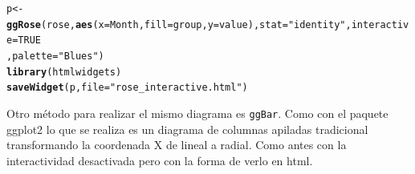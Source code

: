 \documentclass{article}\usepackage[]{graphicx}\usepackage[]{color}
\makeatletter
\newcommand{\hlnum}[1]{\textcolor[rgb]{0.686,0.059,0.569}{#1}}%
\newcommand{\hlstr}[1]{\textcolor[rgb]{0.192,0.494,0.8}{#1}}%
\newcommand{\hlstd}[1]{\textcolor[rgb]{0.345,0.345,0.345}{#1}}%
\newcommand{\hlkwb}[1]{\textcolor[rgb]{0.69,0.353,0.396}{#1}}%
\newcommand{\hlkwc}[1]{\textcolor[rgb]{0.333,0.667,0.333}{#1}}%
\newcommand{\hlkwd}[1]{\textcolor[rgb]{0.737,0.353,0.396}{\textbf{#1}}}%
\newenvironment{kframe}{%
 \def\at@end@of@kframe{}%
 \ifinner\ifhmode%
  \def\at@end@of@kframe{\end{minipage}}%
  \begin{minipage}{\columnwidth}%
 \fi\fi%
 \def\FrameCommand##1{\hskip\@totalleftmargin \hskip-\fboxsep
 \colorbox{shadecolor}{##1}\hskip-\fboxsep
     \hskip-\linewidth \hskip-\@totalleftmargin \hskip\columnwidth}%
 \MakeFramed {\advance\hsize-\width
   \@totalleftmargin\z@ \linewidth\hsize
   \@setminipage}}%
 {\par\unskip\endMakeFramed%
 \at@end@of@kframe}
\newenvironment{knitrout}{}{} %
\makeatother
\begin{document}
\begin{knitrout}
\color{fgcolor}\begin{kframe}
\begin{alltt}
\hlstd{p} \hlkwb{<-} \hlkwd{ggRose}\hlstd{(rose,}\hlkwd{aes}\hlstd{(}\hlkwc{x}\hlstd{=Month,}\hlkwc{fill}\hlstd{=group,}\hlkwc{y}\hlstd{=value),}\hlkwc{stat}\hlstd{=}\hlstr{"identity"}\hlstd{,}\hlkwc{interactive}\hlstd{=}\hlnum{TRUE}
       \hlstd{,} \hlkwc{palette} \hlstd{=} \hlstr{"Blues"}\hlstd{)}
\hlkwd{library}\hlstd{(htmlwidgets)}
\hlkwd{saveWidget}\hlstd{(p,} \hlkwc{file} \hlstd{=} \hlstr{"rose_interactive.html"}\hlstd{)}
\end{alltt}
\end{kframe}
\end{knitrout}
\clearpage
Otro m\'etodo para realizar el mismo diagrama es \texttt{ggBar}. Como con el paquete ggplot2 lo que se realiza es un diagrama de columnas apiladas tradicional transformando la coordenada X de lineal a radial. Como antes con la interactividad desactivada pero con la forma de verlo en html.
\end{document}
